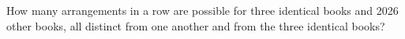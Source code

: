 How many arrangements in a row are possible for three identical books and 2026 other books, all distinct from one another and from the three identical books?
